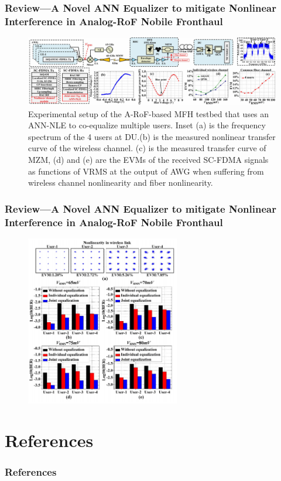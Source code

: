 \documentclass[t]{beamer}
\begin{document}
\begin{frame}
    \frametitle{Review---A Novel ANN Equalizer to mitigate Nonlinear Interference in Analog-RoF Nobile Fronthaul~\cite{Liu2018a}}
    \begin{figure}
        \includegraphics[width=\textwidth]{novelANNSetup.PNG}
        \caption{Experimental setup of the A-RoF-based MFH testbed that uses an ANN-NLE to co-equalize multiple users. 
        Inset (a) is the frequency spectrum of the 4 users at DU.\@ (b) is the measured nonlinear transfer curve of the wireless channel. 
        (c) is the measured transfer curve of MZM, (d) and (e) are the EVMs of the received SC-FDMA signals as functions of VRMS at the 
        output of AWG when suffering from wireless channel nonlinearity and fiber nonlinearity.}
    \end{figure}
\end{frame}

\begin{frame}
    \frametitle{Review---A Novel ANN Equalizer to mitigate Nonlinear Interference in Analog-RoF Nobile Fronthaul~\cite{Liu2018a}}
    \begin{figure}
            
        \includegraphics[width=0.6\textwidth]{novelANNResult.PNG}             
    \end{figure}
\end{frame}

\section{References}
\begin{frame}[t,allowframebreaks]
    \frametitle{References}
    
    

\end{frame}



    
\end{document}
